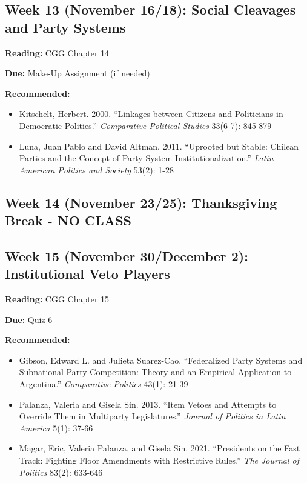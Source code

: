 \documentclass[
  11pt,
]{article}
\providecommand{\tightlist}{%
  \setlength{\itemsep}{0pt}\setlength{\parskip}{0pt}}
\begin{document}
\hypertarget{week-13-november-1618-social-cleavages-and-party-systems}{%
\subsection{Week 13 (November 16/18): Social Cleavages and Party
Systems}\label{week-13-november-1618-social-cleavages-and-party-systems}}

\textbf{Reading:} CGG Chapter 14

\textbf{Due:} Make-Up Assignment (if needed)

\textbf{Recommended:}

\begin{itemize}
\tightlist
\item
  Kitschelt, Herbert. 2000. ``Linkages between Citizens and Politicians
  in Democratic Polities.'' \emph{Comparative Political Studies}
  33(6-7): 845-879
\item
  Luna, Juan Pablo and David Altman. 2011. ``Uprooted but Stable:
  Chilean Parties and the Concept of Party System
  Institutionalization.'' \emph{Latin American Politics and Society}
  53(2): 1-28
\end{itemize}

\hypertarget{week-14-november-2325-thanksgiving-break---no-class}{%
\subsection{Week 14 (November 23/25): Thanksgiving Break - NO
CLASS}\label{week-14-november-2325-thanksgiving-break---no-class}}

\hypertarget{week-15-november-30december-2-institutional-veto-players}{%
\subsection{Week 15 (November 30/December 2): Institutional Veto
Players}\label{week-15-november-30december-2-institutional-veto-players}}

\textbf{Reading:} CGG Chapter 15

\textbf{Due:} Quiz 6

\textbf{Recommended:}

\begin{itemize}
\tightlist
\item
  Gibson, Edward L. and Julieta Suarez-Cao. ``Federalized Party Systems
  and Subnational Party Competition: Theory and an Empirical Application
  to Argentina.'' \emph{Comparative Politics} 43(1): 21-39
\item
  Palanza, Valeria and Gisela Sin. 2013. ``Item Vetoes and Attempts to
  Override Them in Multiparty Legislatures.'' \emph{Journal of Politics
  in Latin America} 5(1): 37-66
\item
  Magar, Eric, Valeria Palanza, and Gisela Sin. 2021. ``Presidents on
  the Fast Track: Fighting Floor Amendments with Restrictive Rules.''
  \emph{The Journal of Politics} 83(2): 633-646
\end{itemize}
\end{document}
